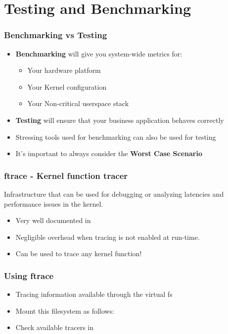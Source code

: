 \section{Testing and Benchmarking}

\begin{frame}
        \frametitle{Benchmarking vs Testing}
        \begin{itemize}
                \item \textbf{Benchmarking} will give you system-wide metrics for:
                        \begin{itemize}
                                \item Your hardware platform
                                \item Your Kernel configuration
                                \item Your Non-critical userspace stack
                        \end{itemize}
                \item \textbf{Testing} will ensure that your business application behaves correctly
                \item Stressing tools used for benchmarking can also be used for testing
                \item It's important to always consider the \textbf{Worst Case Scenario}
        \end{itemize}
\end{frame}

\begin{frame}
  \frametitle{ftrace - Kernel function tracer}

  Infrastructure that can be used for debugging or analyzing latencies
  and performance issues in the kernel.

  \begin{itemize}
  \item Very well documented in 
  \item Negligible overhead when tracing is not enabled at run-time.
  \item Can be used to trace any kernel function!
  \end{itemize}
\end{frame}

\begin{frame}
  \frametitle{Using ftrace}
  \begin{itemize}
  \item Tracing information available through the  virtual fs
  \item Mount this filesystem as follows:\\
  \item Check available tracers in
  \end{itemize}
\end{frame}

